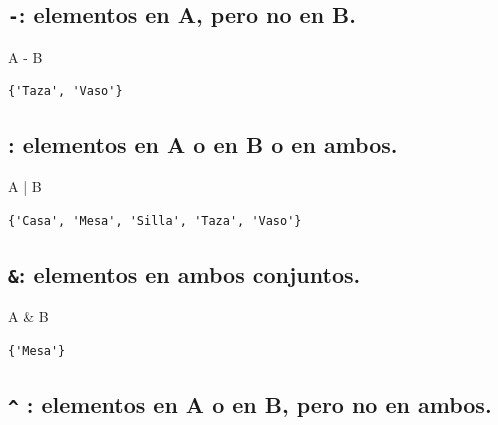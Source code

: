\documentclass[
  spanish,
  letterpaper,
]{scrbook}
\newenvironment{Shaded}{\begin{snugshade}}{\end{snugshade}}
\newcommand{\NormalTok}[1]{\textcolor[rgb]{0.00,0.23,0.31}{#1}}
\newcommand{\OperatorTok}[1]{\textcolor[rgb]{0.37,0.37,0.37}{#1}}
\theoremstyle{definition}
\theoremstyle{remark}
\begin{document}
\subsection{\texorpdfstring{\texttt{-}: elementos en A, pero no en
B.}{-: elementos en A, pero no en B.}}\label{elementos-en-a-pero-no-en-b.}

\begin{Shaded}
\begin{Highlighting}[]
\NormalTok{A }\OperatorTok{{-}}\NormalTok{ B }
\end{Highlighting}
\end{Shaded}

\begin{verbatim}
{'Taza', 'Vaso'}
\end{verbatim}

\subsection{\texorpdfstring{\texttt{\textbar{}}: elementos en A o en B o
en
ambos.}{\textbar: elementos en A o en B o en ambos.}}\label{elementos-en-a-o-en-b-o-en-ambos.}

\begin{Shaded}
\begin{Highlighting}[]
\NormalTok{A }\OperatorTok{|}\NormalTok{ B }
\end{Highlighting}
\end{Shaded}

\begin{verbatim}
{'Casa', 'Mesa', 'Silla', 'Taza', 'Vaso'}
\end{verbatim}

\subsection{\texorpdfstring{\texttt{\&}: elementos en ambos
conjuntos.}{\&: elementos en ambos conjuntos.}}\label{elementos-en-ambos-conjuntos.}

\begin{Shaded}
\begin{Highlighting}[]
\NormalTok{A }\OperatorTok{\&}\NormalTok{ B }
\end{Highlighting}
\end{Shaded}

\begin{verbatim}
{'Mesa'}
\end{verbatim}

\subsection{\texorpdfstring{\texttt{\^{}} : elementos en A o en B, pero
no en
ambos.}{\^{} : elementos en A o en B, pero no en ambos.}}\label{elementos-en-a-o-en-b-pero-no-en-ambos.}
\end{document}
